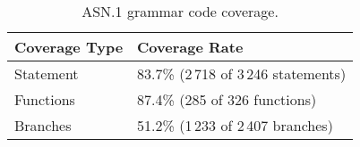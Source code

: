 
\begin{table}[h]

\centering
\begin{tabular}{|l|l|}
\hline
\textbf{Coverage Type} & \textbf{Coverage Rate} \\
\hline
Statement     & 83.7\% (2\,718 of 3\,246 statements)\\
Functions     & 87.4\% (285 of 326 functions)\\
Branches      & 51.2\% (1\,233 of 2\,407 branches)\\
\hline
\end{tabular}
\caption{ASN.1 grammar code coverage.}
\label{table:asn1grammar_coverage}

\end{table}